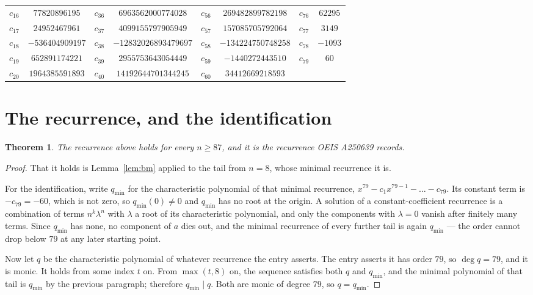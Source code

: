 \documentclass[11pt,a4paper]{article}
\theoremstyle{plain}
\newtheorem{theorem}{Theorem}
\theoremstyle{definition}
\begin{document}
\begin{center}
\begin{tabular}{cccccccc}
$c_{16}$ & $77820896195$ & $c_{36}$ & $6963562000774028$ & $c_{56}$ & $269482899782198$ & $c_{76}$ & $62295$ \\
$c_{17}$ & $24952467961$ & $c_{37}$ & $4099155797905949$ & $c_{57}$ & $157085705792064$ & $c_{77}$ & $3149$ \\
$c_{18}$ & $-536404909197$ & $c_{38}$ & $-12832026893479697$ & $c_{58}$ & $-134224750748258$ & $c_{78}$ & $-1093$ \\
$c_{19}$ & $652891174221$ & $c_{39}$ & $2955753643054449$ & $c_{59}$ & $-1440272443510$ & $c_{79}$ & $60$ \\
$c_{20}$ & $1964385591893$ & $c_{40}$ & $14192644701344245$ & $c_{60}$ & $34412669218593$ &  &  \\
\end{tabular}
\end{center}

\section{The recurrence, and the identification}

\begin{theorem}
The recurrence above holds for every $n\ge87$, and it is the recurrence OEIS A250639 records.
\end{theorem}

\begin{proof}
That it holds is Lemma~\ref{lem:bm} applied to the tail from $n=8$, whose minimal
recurrence it is.

For the identification, write $q_{\min}$ for the characteristic polynomial of that minimal
recurrence, $x^{79}-c_1x^{79-1}-\dots-c_{79}$. Its constant term is
$-c_{79}=-60$, which is not zero, so $q_{\min}(0)\neq0$ and $q_{\min}$ has no
root at the origin. A solution of a constant-coefficient recurrence is a combination of terms
$n^{k}\lambda^{n}$ with $\lambda$ a root of its characteristic polynomial, and only the
components with $\lambda=0$ vanish after finitely many terms. Since $q_{\min}$ has none, no
component of $a$ dies out, and the minimal recurrence of every further tail is again
$q_{\min}$ --- the order cannot drop below $79$ at any later starting point.

Now let $q$ be the characteristic polynomial of whatever recurrence the entry asserts. The
entry asserts it has order $79$, so $\deg q=79$, and it is monic. It holds from some
index $t$ on. From $\max(t,8)$ on, the sequence satisfies both $q$ and $q_{\min}$, and
the minimal polynomial of that tail is $q_{\min}$ by the previous paragraph; therefore
$q_{\min}\mid q$. Both are monic of degree $79$, so $q=q_{\min}$.
\end{proof}
\end{document}
